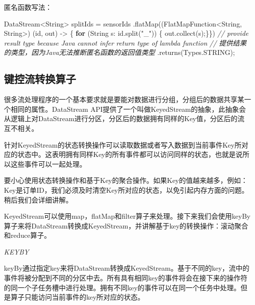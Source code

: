 \documentclass[cn,11pt,chinese]{elegantbook}
\newenvironment{Shaded}{}{}
\newcommand{\BuiltInTok}[1]{#1}
\newcommand{\CommentTok}[1]{\textcolor[rgb]{0.38,0.63,0.69}{\textit{#1}}}
\newcommand{\FunctionTok}[1]{\textcolor[rgb]{0.02,0.16,0.49}{#1}}
\newcommand{\KeywordTok}[1]{\textcolor[rgb]{0.00,0.44,0.13}{\textbf{#1}}}
\newcommand{\NormalTok}[1]{#1}
\newcommand{\StringTok}[1]{\textcolor[rgb]{0.25,0.44,0.63}{#1}}
\renewenvironment{quote}{\begin{customblockquote}\list{}{\rightmargin=0em\leftmargin=0em}%
\item\relax\color{blockquote-text}\ignorespaces}{\unskip\unskip\endlist\end{customblockquote}}
\begin{document}
匿名函数写法：

\begin{Shaded}
\begin{Highlighting}[]
\NormalTok{DataStream\textless{}}\BuiltInTok{String}\NormalTok{\textgreater{} splitIds = sensorIds}
\NormalTok{    .}\FunctionTok{flatMap}\NormalTok{((FlatMapFunction\textless{}}\BuiltInTok{String}\NormalTok{, }\BuiltInTok{String}\NormalTok{\textgreater{})}
\NormalTok{            (id, out) {-}\textgreater{} \{ }\KeywordTok{for}\NormalTok{ (}\BuiltInTok{String}\NormalTok{ s: id.}\FunctionTok{split}\NormalTok{(}\StringTok{"\_"}\NormalTok{)) \{ out.}\FunctionTok{collect}\NormalTok{(s);\}\})}
    \CommentTok{// provide result type because Java cannot infer return type of lambda function}
    \CommentTok{// 提供结果的类型，因为Java无法推断匿名函数的返回值类型}
\NormalTok{    .}\FunctionTok{returns}\NormalTok{(}\BuiltInTok{Types}\NormalTok{.}\FunctionTok{STRING}\NormalTok{);}
\end{Highlighting}
\end{Shaded}

\hypertarget{ux952eux63a7ux6d41ux8f6cux6362ux7b97ux5b50}{%
\subsection{键控流转换算子}\label{ux952eux63a7ux6d41ux8f6cux6362ux7b97ux5b50}}

很多流处理程序的一个基本要求就是要能对数据进行分组，分组后的数据共享某一个相同的属性。DataStream
API提供了一个叫做KeyedStream的抽象，此抽象会从逻辑上对DataStream进行分区，分区后的数据拥有同样的Key值，分区后的流互不相关。

针对KeyedStream的状态转换操作可以读取数据或者写入数据到当前事件Key所对应的状态中。这表明拥有同样Key的所有事件都可以访问同样的状态，也就是说所以这些事件可以一起处理。

\begin{quote}
要小心使用状态转换操作和基于Key的聚合操作。如果Key的值越来越多，例如：Key是订单ID，我们必须及时清空Key所对应的状态，以免引起内存方面的问题。稍后我们会详细讲解。
\end{quote}

KeyedStream可以使用map，flatMap和filter算子来处理。接下来我们会使用keyBy算子来将DataStream转换成KeyedStream，并讲解基于key的转换操作：滚动聚合和reduce算子。

\emph{KEYBY}

keyBy通过指定key来将DataStream转换成KeyedStream。基于不同的key，流中的事件将被分配到不同的分区中去。所有具有相同key的事件将会在接下来的操作符的同一个子任务槽中进行处理。拥有不同key的事件可以在同一个任务中处理。但是算子只能访问当前事件的key所对应的状态。
\end{document}
